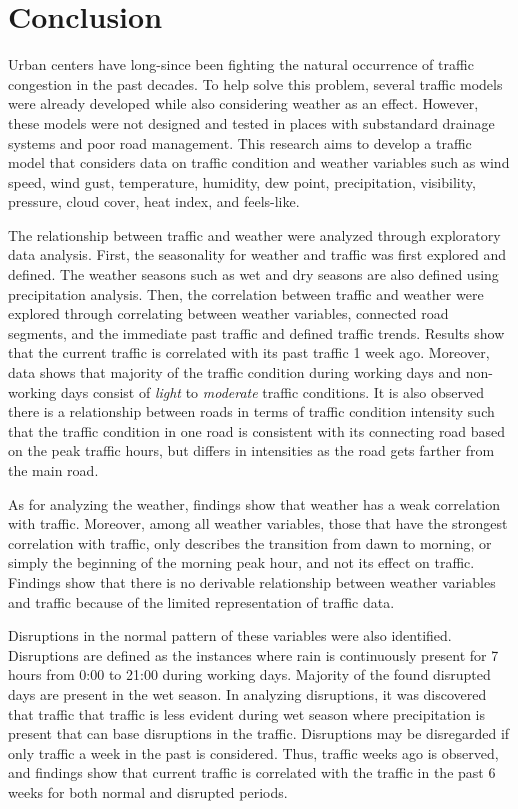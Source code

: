 \chapter{Conclusion}

Urban centers have long-since been fighting the natural occurrence of traffic congestion in the past decades. To help solve this problem, several traffic models were already developed while also considering weather as an effect. However, these models were not designed and tested in places with substandard drainage systems and poor road management. This research aims to develop a traffic model that considers data on traffic condition and weather variables such as wind speed, wind gust, temperature, humidity, dew point, precipitation, visibility, pressure, cloud cover, heat index, and feels-like.

The relationship between traffic and weather were analyzed through exploratory data analysis. First, the seasonality for weather and traffic was first explored and defined. The weather seasons such as wet and dry seasons are also defined using precipitation analysis. Then, the correlation between traffic and weather were explored through correlating between weather variables, connected road segments, and the immediate past traffic and defined traffic trends. Results show that the current traffic is correlated with its past traffic 1 week ago. Moreover, data shows that majority of the traffic condition during working days and non-working days consist of \textit{light} to \textit{moderate} traffic conditions. It is also observed there is a relationship between roads in terms of traffic condition intensity such that the traffic condition in one road is consistent with its connecting road based on the peak traffic hours, but differs in intensities as the road gets farther from the main road. 

As for analyzing the weather, findings show that weather has a weak correlation with traffic. Moreover, among all weather variables, those that have the strongest correlation with traffic, only describes the transition from dawn to morning, or simply the beginning of the morning peak hour, and not its effect on traffic. Findings show that there is no derivable relationship between weather variables and traffic because of the limited representation of traffic data. 

Disruptions in the normal pattern of these variables were also identified. Disruptions are defined as the instances where rain is continuously present for 7 hours from 0:00 to 21:00 during working days. Majority of the found disrupted days are present in the wet season. In analyzing disruptions, it was discovered that traffic that traffic is less evident during wet season where precipitation is present that can base disruptions in the traffic. Disruptions may be disregarded if only traffic a week in the past is considered. Thus, traffic weeks ago is observed, and findings show that current traffic is correlated with the traffic in the past 6 weeks for both normal and disrupted periods. 

